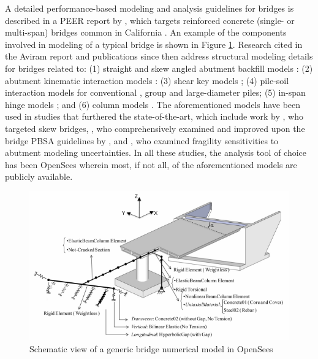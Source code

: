 A detailed performance-based modeling and analysis guidelines for bridges is described in a PEER report by \cite{aviram2008guidelines}, which targets reinforced concrete (single- or multi-span) bridges common in California \citep{nbi2016national}. An example of the components involved in modeling of a typical bridge is shown in Figure \ref{fig:response_BridgeModel}. Research cited in the Aviram report and publications since then address structural modeling details for bridges related to: (1) straight and skew angled abutment backfill models \citep{shamsabadi2010validated}: (2) abutment kinematic interaction models \citep{zhang2002kinematic}: (3) shear key models \citep[e.g.][]{silva2009seismic}; (4) pile-soil interaction models for conventional \citep{hutchinson2001inelastic, taciroglu2006robust}, group \citep{lemnitzer2010nonlinear} and large-diameter \citep{khalili-tehrani2014nonlinear} piles; (5) in-span hinge models \citep{hube2008experimental}; and (6) column models \citep{terzic2015concrete, xu2011hysteretic}. The aforementioned models have been used in studies that furthered the state-of-the-art, which include work by \cite{kaviani2014performancebased}, who targeted skew bridges, \cite{omrani2015guidelines}, who comprehensively examined and improved upon the bridge PBSA guidelines by \cite{aviram2008guidelines}, and \cite{omrani2017variability}, who examined fragility sensitivities to abutment modeling uncertainties. In all these studies, the analysis tool of choice has been OpenSees \citep{mckenna2011opensees} wherein most, if not all, of the aforementioned models are publicly available. 

\begin{figure}[htb]
    \centering
    \includegraphics[width=1.0\textwidth, angle = 0]{Figures/BridgeModel.pdf}
    \caption{Schematic view of a generic bridge numerical model in OpenSees \citep{kaviani2012seismic}}
    \label{fig:response_BridgeModel}
\end{figure}

